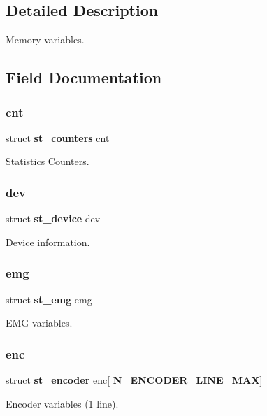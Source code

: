 \subsection{Detailed Description}
Memory variables. 



\subsection{Field Documentation}
\mbox{\label{structst__eeprom_a0ffc8a85c87e768e5f0f4682ad738f47}} 
\subsubsection{cnt}
{\footnotesize\ttfamily struct \textbf{ st\+\_\+counters} cnt}

Statistics Counters. \mbox{\label{structst__eeprom_a0d9bfa887343b9469fc02391208359ff}} 
\subsubsection{dev}
{\footnotesize\ttfamily struct \textbf{ st\+\_\+device} dev}

Device information. \mbox{\label{structst__eeprom_a423333afbc7d0ab697d1f8e12ef8271f}} 
\subsubsection{emg}
{\footnotesize\ttfamily struct \textbf{ st\+\_\+emg} emg}

E\+MG variables. \mbox{\label{structst__eeprom_aa275bd5d24411d272636769852d7ccdc}} 
\subsubsection{enc}
{\footnotesize\ttfamily struct \textbf{ st\+\_\+encoder} enc[\textbf{ N\+\_\+\+E\+N\+C\+O\+D\+E\+R\+\_\+\+L\+I\+N\+E\+\_\+\+M\+AX}]}

Encoder variables (1 line). \mbox{\label{structst__eeprom_a928bf130fc931f6623a2ae15be1f7b18}} 
